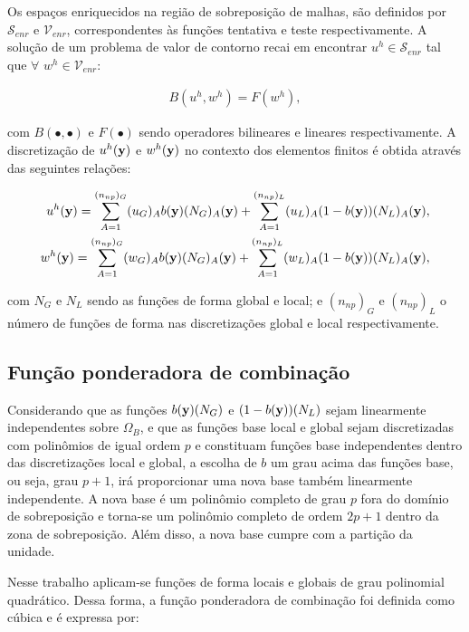 Os espaços enriquecidos na região de sobreposição de malhas, são definidos por $\mathcal{S}_{enr}$ e $\mathcal{V}_{enr}$, correspondentes às funções tentativa e teste respectivamente. A solução de um problema de valor de contorno recai em encontrar $u^{h} \in \mathcal{S}_{enr}$ tal que $\forall$ $ w^{h} \in \mathcal{V}_{enr}$: 

\begin{align}
B(u^{h},w^{h}) = F(w^{h}),
\end{align}

\noindent com $B(\bullet,\bullet)$ e $F(\bullet)$ sendo operadores bilineares e lineares respectivamente. A discretização de $u^{h}(\mathbf{y})$ e $w^{h}(\mathbf{y})$ no contexto dos elementos finitos é obtida através das seguintes relações:

\begin{align}
u^{h}(\mathbf{y}) = \sum_{A = 1}^{(n_{np})_G} (u_{G})_{A}b(\mathbf{y})(N_{G})_{A}(\mathbf{y}) + \sum_{A = 1}^{(n_{np})_L} (u_{L})_{A}(1-b(\mathbf{y}))(N_{L})_{A}(\mathbf{y}),\label{eq:u_mod} \\ 
w^{h}(\mathbf{y}) = \sum_{A = 1}^{(n_{np})_G} (w_{G})_{A}b(\mathbf{y})(N_{G})_{A}(\mathbf{y}) + \sum_{A = 1}^{(n_{np})_L} (w_{L})_{A}(1-b(\mathbf{y}))(N_{L})_{A}(\mathbf{y}), \label{eq:w_mod}
\end{align}

\noindent com $N_{G}$ e $N_{L}$ sendo as funções de forma global e local; e $(n_{np})_G$ e $(n_{np})_L$ o número de funções de forma nas discretizações global e local respectivamente. 

\subsection{Função ponderadora de combinação}

Considerando que as funções $b(\mathbf{y})(N_{G})$ e $(1-b(\mathbf{y}))(N_{L})$ sejam linearmente independentes sobre $\Omega_{B}$, e que as funções base local e global sejam discretizadas com polinômios de igual ordem $p$ e constituam funções base independentes dentro das discretizações local e global, a escolha de $b$ um grau acima das funções base, ou seja, grau $p+1$, irá proporcionar uma nova base também linearmente independente. A nova base é um polinômio completo de grau $p$ fora do domínio de sobreposição e torna-se um polinômio completo de ordem $2p+1$ dentro da zona de sobreposição. Além disso, a nova base cumpre com a partição da unidade.

Nesse trabalho aplicam-se funções de forma locais e globais de grau polinomial quadrático. Dessa forma, a função ponderadora de combinação foi definida como cúbica e é expressa por:

